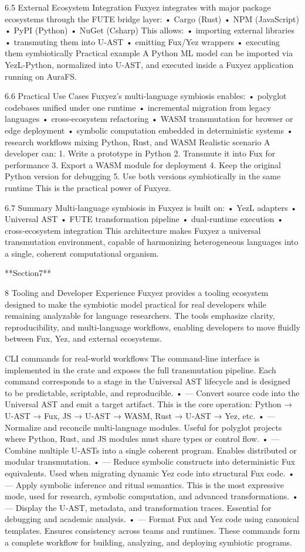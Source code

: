 6.5 External Ecosystem Integration
Fuxyez integrates with major package ecosystems through the FUTE bridge layer:
• 	Cargo (Rust)
• 	NPM (JavaScript)
• 	PyPI (Python)
• 	NuGet (Csharp)
This allows:
• 	importing external libraries
• 	transmuting them into U‑AST
• 	emitting Fux/Yez wrappers
• 	executing them symbiotically
Practical example
A Python ML model can be imported via YezL‑Python, normalized into U‑AST, and executed inside a Fuxyez application running on AuraFS.

6.6 Practical Use Cases
Fuxyez’s multi‑language symbiosis enables:
• 	polyglot codebases unified under one runtime
• 	incremental migration from legacy languages
• 	cross‑ecosystem refactoring
• 	WASM transmutation for browser or edge deployment
• 	symbolic computation embedded in deterministic systems
• 	research workflows mixing Python, Rust, and WASM
Realistic scenario
A developer can:
1. 	Write a prototype in Python
2. 	Transmute it into Fux for performance
3. 	Export a WASM module for deployment
4. 	Keep the original Python version for debugging
5. 	Use both versions symbiotically in the same runtime
This is the practical power of Fuxyez.

6.7 Summary
Multi‑language symbiosis in Fuxyez is built on:
• 	YezL adapters
• 	Universal AST
• 	FUTE transformation pipeline
• 	dual‑runtime execution
• 	cross‑ecosystem integration
This architecture makes Fuxyez a universal transmutation environment, capable of harmonizing heterogeneous languages into a single, coherent computational organism.

**Section7**

8 Tooling and Developer Experience
Fuxyez provides a tooling ecosystem designed to make the symbiotic model practical for real developers while remaining analyzable for language researchers. The tools emphasize clarity, reproducibility, and multi‑language workflows, enabling developers to move fluidly between Fux, Yez, and external ecosystems.

CLI commands for real-world workflows
The command-line interface is implemented in the  crate and exposes the full transmutation pipeline. Each command corresponds to a stage in the Universal AST lifecycle and is designed to be predictable, scriptable, and reproducible.
• 	 — Convert source code into the Universal AST and emit a target artifact.
This is the core operation: Python → U‑AST → Fux, JS → U‑AST → WASM, Rust → U‑AST → Yez, etc.
• 	 — Normalize and reconcile multi-language modules.
Useful for polyglot projects where Python, Rust, and JS modules must share types or control flow.
• 	 — Combine multiple U‑ASTs into a single coherent program.
Enables distributed or modular transmutation.
• 	 — Reduce symbolic constructs into deterministic Fux equivalents.
Used when migrating dynamic Yez code into structural Fux code.
• 	 — Apply symbolic inference and ritual semantics.
This is the most expressive mode, used for research, symbolic computation, and advanced transformations.
• 	 — Display the U‑AST, metadata, and transformation traces.
Essential for debugging and academic analysis.
• 	 — Format Fux and Yez code using canonical templates.
Ensures consistency across teams and runtimes.
These commands form a complete workflow for building, analyzing, and deploying symbiotic programs.


